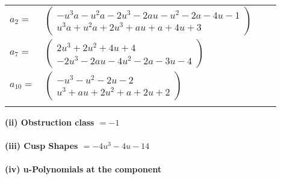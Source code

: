 \documentclass[1p]{elsarticle_modified}
\theoremstyle{definition}
\begin{document}
\begin{tabular}{m{7pt} m{180pt} m{7pt} m{180pt} }
\flushright $a_{2}=$&$\begin{pmatrix}- u^3 a- u^2 a-2 u^3-2 a u- u^2-2 a-4 u-1\\u^3 a+u^2 a+2 u^3+a u+a+4 u+3\end{pmatrix}$ \\
\flushright $a_{7}=$&$\begin{pmatrix}2 u^3+2 u^2+4 u+4\\-2 u^3-2 a u-4 u^2-2 a-3 u-4\end{pmatrix}$ \\
\flushright $a_{10}=$&$\begin{pmatrix}- u^3- u^2-2 u-2\\u^3+a u+2 u^2+a+2 u+2\end{pmatrix}$\\&\end{tabular}
\flushleft \textbf{(ii) Obstruction class $= -1$}\\~\\
\flushleft \textbf{(iii) Cusp Shapes $= -4 u^3-4 u-14$}\\~\\
\newpage\renewcommand{\arraystretch}{1}
\flushleft \textbf{(iv) u-Polynomials at the component}\newline \\
\end{document}
